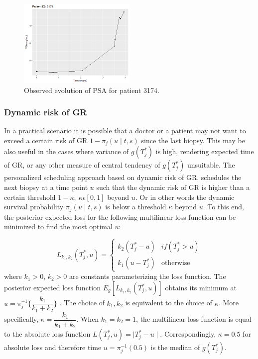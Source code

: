 \begin{figure}[!htb]
    \centering
    \captionsetup{justification=centering}
    \includegraphics[width=0.5\textwidth]{images/observed_psa_3174.png}
    \caption{Observed evolution of PSA for patient 3174.}
    \label{fig : observed_psa_3174}
\end{figure}

\subsubsection{Dynamic risk of GR}
\label{subsubsec : dynamic_risk_definitions}
In a practical scenario it is possible that a doctor or a patient may not want to exceed a certain risk of GR $1 - \pi_j(u \mid t, s)$ since the last biopsy. This may be also useful in the cases where variance of $g(T^*_j)$ is high, rendering expected time of GR, or any other measure of central tendency of $g(T^*_j)$ unsuitable. The personalized scheduling approach based on dynamic risk of GR, schedules the next biopsy at a time point $u$ such that the dynamic risk of GR is higher than a certain threshold $1-\kappa,\ \kappa \epsilon [0,1]$ beyond $u$. Or in other words the dynamic survival probability $\pi_j(u \mid t, s)$ is below a threshold $\kappa$ beyond $u$. To this end, the posterior expected loss for the following multilinear loss function can be minimized to find the most optimal $u$:

\begin{equation}
\label{eq : loss_dynamic_risk}
L_{k_1, k_2}(T^*_j, u) =
    \begin{cases}
      k_2(T^*_j-u) & if(T^*_j > u)\\
      k_1(u-T^*_j) & \text{otherwise}
    \end{cases}       
\end{equation}
where $k_1 > 0$, $k_2 > 0$ are constants parameterizing the loss function. The posterior expected loss function $E_g[L_{k_1, k_2}(T^*_j, u)]$ obtains its minimum at $u = \pi_j^{-1}\Big\{\dfrac{k_1}{k_1 + k_2}\Big\}$ \citep{robertBayesianChoice}. The choice of $k_1, k_2$ is equivalent to the choice of $\kappa$. More specifically, $\kappa = \dfrac{k_1}{k_1 + k_2}$. When $k_1=k_2=1$, the multilinear loss function is equal to the absolute loss function $L(T^*_j, u) = \mid T^*_j - u \mid$. Correspondingly, $\kappa = 0.5$ for absolute loss and therefore time $u = \pi_j^{-1}(0.5)$ is the median of $g(T^*_j)$.

